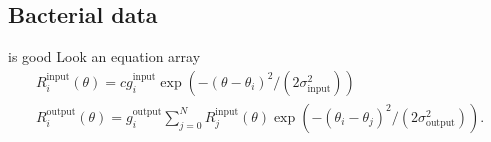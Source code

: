 \documentclass[11pt]{article}
\begin{document}
\subsection{Bacterial data}
is good
Look an equation array
\begin{equation}
\begin{array}{l}
R_i^{\mathrm{input}}(\theta) = c g_i^{\mathrm{input}}\exp(-(\theta - \theta_i)^2 / (2\sigma^2_{\mathrm{input}}))
\\
R_i^{\mathrm{output}}(\theta) = g_i^{\mathrm{output}}\sum_{j=0}^N R_j^{\mathrm{input}}(\theta) \exp(-(\theta_i - \theta_j)^2/(2\sigma^2_{\mathrm{output}})) .
\end{array}
\end{equation}


\end{document}

